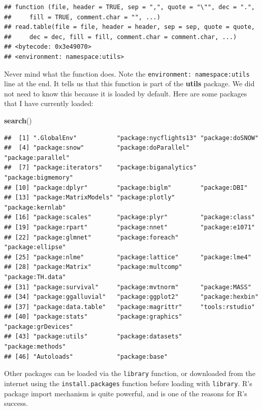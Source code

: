 \documentclass[]{book}
\newenvironment{Shaded}{\begin{snugshade}}{\end{snugshade}}
\newcommand{\KeywordTok}[1]{\textcolor[rgb]{0.13,0.29,0.53}{\textbf{#1}}}
\newcommand{\NormalTok}[1]{#1}
\theoremstyle{definition}
\theoremstyle{definition}
\theoremstyle{definition}
\theoremstyle{remark}
\begin{document}
\begin{verbatim}
## function (file, header = TRUE, sep = ",", quote = "\"", dec = ".", 
##     fill = TRUE, comment.char = "", ...) 
## read.table(file = file, header = header, sep = sep, quote = quote, 
##     dec = dec, fill = fill, comment.char = comment.char, ...)
## <bytecode: 0x3e49070>
## <environment: namespace:utils>
\end{verbatim}

Never mind what the function does. Note the
\texttt{environment:\ namespace:utils} line at the end. It tells us that
this function is part of the \textbf{utils} package. We did not need to
know this because it is loaded by default. Here are some packages that I
have currently loaded:

\begin{Shaded}
\begin{Highlighting}[]
\KeywordTok{search}\NormalTok{()}
\end{Highlighting}
\end{Shaded}

\begin{verbatim}
##  [1] ".GlobalEnv"           "package:nycflights13" "package:doSNOW"      
##  [4] "package:snow"         "package:doParallel"   "package:parallel"    
##  [7] "package:iterators"    "package:biganalytics" "package:bigmemory"   
## [10] "package:dplyr"        "package:biglm"        "package:DBI"         
## [13] "package:MatrixModels" "package:plotly"       "package:kernlab"     
## [16] "package:scales"       "package:plyr"         "package:class"       
## [19] "package:rpart"        "package:nnet"         "package:e1071"       
## [22] "package:glmnet"       "package:foreach"      "package:ellipse"     
## [25] "package:nlme"         "package:lattice"      "package:lme4"        
## [28] "package:Matrix"       "package:multcomp"     "package:TH.data"     
## [31] "package:survival"     "package:mvtnorm"      "package:MASS"        
## [34] "package:ggalluvial"   "package:ggplot2"      "package:hexbin"      
## [37] "package:data.table"   "package:magrittr"     "tools:rstudio"       
## [40] "package:stats"        "package:graphics"     "package:grDevices"   
## [43] "package:utils"        "package:datasets"     "package:methods"     
## [46] "Autoloads"            "package:base"
\end{verbatim}

Other packages can be loaded via the \texttt{library} function, or
downloaded from the internet using the \texttt{install.packages}
function before loading with \texttt{library}. R's package import
mechanism is quite powerful, and is one of the reasons for R's success.
\end{document}
